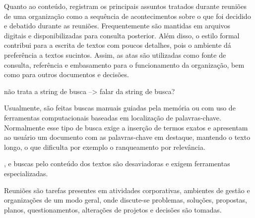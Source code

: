 Quanto ao conteúdo, registram os principais assuntos tratados durante reuniões de uma organização como a sequência de acontecimentos sobre o que foi decidido e debatido durante as reuniões. Frequentemente são mantidas em arquivos digitais e disponibilizadas para consulta posterior.  Além disso, o estilo formal contribui para a escrita de textos com poucos detalhes, pois o ambiente dá preferência a textos sucintos.  Assim, as atas são utilizadas como fonte de consulta, referência e embasamento para o funcionamento da organização, bem como para outros documentos e decisões.




não trata a string de busca --> falar da string de busca?








Usualmente, são feitas buscas manuais guiadas pela memória ou com uso de ferramentas computacionais baseadas em localização de palavras-chave. Normalmente esse tipo de busca exige a inserção de termos exatos e apresentam ao usuário um documento com as palavras-chave em destaque, mantendo o texto longo, o que dificulta por exemplo o ranqueamento por relevância. 


, e buscas pelo conteúdo dos textos são desaviadoras e exigem ferramentas especializadas.


Reuniões são tarefas presentes em atividades corporativas, ambientes de gestão e organizações de um modo geral, onde discute-se problemas, soluções, propostas, planos, questionamentos, alterações de projetos e decisões são tomadas. 



